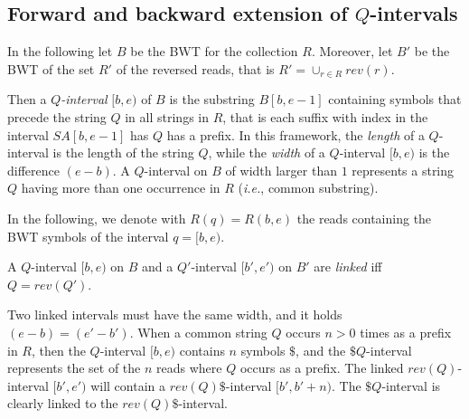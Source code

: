 \documentclass[runningheads,envcountsame,a4paper]{llncs}
\newcommand{\ie}{\textit{i.e.},\xspace}
\begin{document}



\subsection{Forward and backward extension of $Q$-intervals}

In the following let $B$ be the BWT for the collection $R$.  Moreover, let $B'$ be the BWT of the set $R'$ of the reversed reads, that is $R' = \cup_{r \in R}rev(r)$.


Then a  {\em  $Q$-interval} $[b,e)$ of $B$ is the  substring  $B[b, e -1]$ containing symbols  that precede the string $Q$ in all strings  in $R$, that is each suffix  with index in the interval $SA[b, e-1]$ has $Q$ has a prefix.  In this framework, the \emph{length} of a $Q$-interval is the length of the string $Q$, while the \emph{width} of a $Q$-interval $[b, e)$ is the difference $(e-b)$. A $Q$-interval on $B$ of width larger than $1$  represents a string $Q$ having more than one occurrence in $R$ (\ie common substring).

In the following, we denote with $R(q)=R(b,e)$ the reads containing the BWT symbols of the interval $q=[b,e)$.


\begin{definition}
A $Q$-interval $[b,e)$ on $B$ and a $Q'$-interval $[b',e')$ on $B'$ are \emph{linked} iff $Q=rev(Q')$.
\end{definition}

Two linked intervals must have the same width, and it holds $(e-b)=(e'-b')$.
When a common string $Q$ occurs $n>0$ times as a prefix in $R$, then the $Q$-interval $[b,e)$ contains $n$ symbols $\$$, and the $\$ Q$-interval represents the set of the $n$ reads where $Q$ occurs as a prefix. The linked $rev(Q)$-interval $[b',e')$ will contain a $rev(Q)\$$-interval $[b',b'+n)$. The $\$ Q$-interval is clearly linked to the $rev(Q)\$$-interval.
\end{document}
